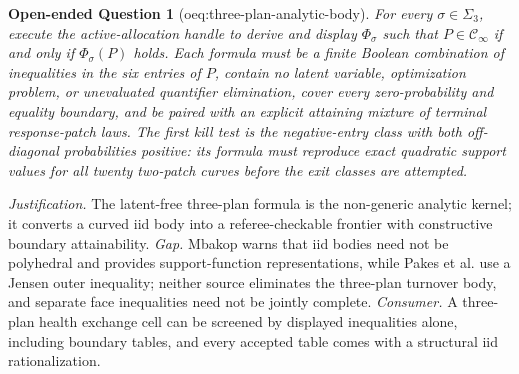 \documentclass{article}
\newtheorem{openendedquestion}{Open-ended Question}
\begin{document}
\begin{openendedquestion}[oeq:three-plan-analytic-body]\label{oeq:three-plan-analytic-body}
For every \(\sigma\in\Sigma_3\), execute the active-allocation handle to derive and display \(\Phi_\sigma\) such that \(P\in\mathcal C_\infty\) if and only if \(\Phi_\sigma(P)\) holds. Each formula must be a finite Boolean combination of inequalities in the six entries of \(P\), contain no latent variable, optimization problem, or unevaluated quantifier elimination, cover every zero-probability and equality boundary, and be paired with an explicit attaining mixture of terminal response-patch laws. The first kill test is the negative-entry class with both off-diagonal probabilities positive: its formula must reproduce exact quadratic support values for all twenty two-patch curves before the exit classes are attempted.
\end{openendedquestion}
\par\smallskip\noindent \textit{Justification.} The latent-free three-plan formula is the non-generic analytic kernel; it converts a curved iid body into a referee-checkable frontier with constructive boundary attainability. \textit{Gap.} Mbakop warns that iid bodies need not be polyhedral and provides support-function representations, while Pakes et al. use a Jensen outer inequality; neither source eliminates the three-plan turnover body, and separate face inequalities need not be jointly complete. \textit{Consumer.} A three-plan health exchange cell can be screened by displayed inequalities alone, including boundary tables, and every accepted table comes with a structural iid rationalization.
\end{document}
